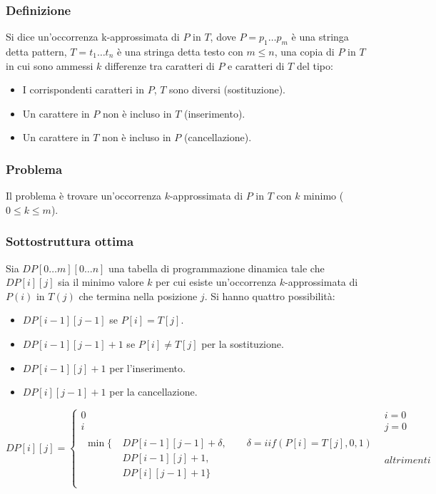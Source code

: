 \subsubsection{Definizione}
Si dice un'occorrenza k-approssimata di $P$ in $T$, dove $P=p_1\dots p_m$ \`e una stringa detta pattern, $T=t_1\dots t_n$ \`e una stringa detta testo con $m\le n$, una copia di $P$ in 
$T$ in cui sono ammessi $k$ differenze tra caratteri di $P$ e caratteri di $T$ del tipo:
\begin{itemize}
	\item I corrispondenti caratteri in $P$, $T$ sono diversi (sostituzione).
	\item Un carattere in $P$ non \`e incluso in $T$ (inserimento).
	\item Un carattere in $T$ non \`e incluso in $P$ (cancellazione).
\end{itemize}
\subsubsection{Problema}
Il problema \`e trovare un'occorrenza $k$-approssimata di $P$ in $T$ con $k$ minimo ($0\le k \le m$).
\subsubsection{Sottostruttura ottima}
Sia $DP[0\dots m][0\dots n]$ una tabella di programmazione dinamica tale che $DP[i][j]$ sia il minimo valore $k$ per cui esiste un'occorrenza $k$-approssimata di $P(i)$ in $T(j)$ che
termina nella posizione $j$. Si hanno quattro possibilit\`a:
\begin{itemize}
	\item $DP[i-1][j-1]$ se $P[i]=T[j]$.
	\item $DP[i-1][j-1]+1$ se $P[i]\neq T[j]$ per la sostituzione.
	\item $DP[i-1][j]+1$ per l'inserimento.
	\item $DP[i][j-1]+1$ per la cancellazione.
\end{itemize}
$$DP[i][j] =
\begin{cases}
	0 & i = 0\\
	i & j = 0\\
\begin{split}
	\min\{\	& DP[i-1][j-1]+\delta, \quad\quad \delta = iif(P[i]=T[j], 0, 1)\\
		& DP[i-1][j]+1, \\
		& DP[i][j-1]+1\} \\
	\end{split}& altrimenti
\end{cases}$$
